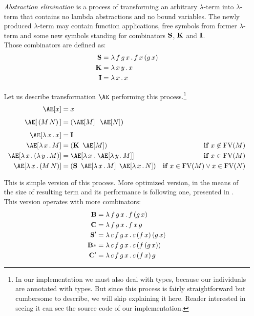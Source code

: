 \documentclass[12pt,a4paper]{report}
\newcommand{\Lets}{Let us\xspace}
\newcommand{\lterm}{$\lambda$-term\xspace}
\begin{document}
\textit{Abstraction elimination} is a process of transforming 
an arbitrary \lterm into \lterm that contains no lambda abstractions
and no bound variables.
The newly produced \lterm may contain function applications, 
free symbols from former \lterm and some new symbols standing for 
combinators $\mathbf{S}$, $\mathbf{K}$ and $\mathbf{I}$. \\

Those combinators are defined as:
\begin{align*}
\mathbf{S} &= \lambda \, f\,g\,x \, . \, f\,x\,(g\,x) \\
\mathbf{K} &= \lambda \, x\,y \, . \, x \\
\mathbf{I} &= \lambda \, x \, . \, x 
\end{align*}

\newcommand{\Ae}{\mathop{\mathrm{\AE}}}

\Lets describe transformation $\Ae$ performing this 
process.\footnote{In our implementation we must also deal with types, because 
our individuals are annotated with types. But since this process
is fairly straightforward but cumbersome to describe, we will 
skip explaining it here. Reader interested in seeing it can see 
the source code of our implementation. }
\begin{align*}
\Ae[x]           &= x &\\[0.4em]
\Ae[\,(M\,N)\,]  &= (\Ae[M]\;\;\Ae[N]) &\\[0.4em]
\Ae[\lam{x}{x}]  &= \Icomb &\\
\Ae[\lam{x}{M}]  &= (\Kcomb~\Ae[M]) &\textbf{if } x \not\in \FV(M)\\
\Ae[\lam{x}{\lamb{y}{M}}] &= \Ae[\lam{x}{\Ae[\lam{y}{M}]}]  
&\textbf{if } x \in \FV(M)\\
\Ae[\lam{x}{(M\,N)}] &= (\Scomb~\Ae[\lam{x}{M}]~\Ae[\lam{x}{N}])  
&\textbf{if } x \in \FV(M) \vee x \in \FV(N)\\
\end{align*}

\newcommand{\Bcomb }{\mathbf{B}}   
\newcommand{\BBcomb }{\mathbf{B*}}
\newcommand{\Ccomb }{\mathbf{C}}   
\newcommand{\CCcomb }{\mathbf{C'}}
\newcommand{\SScomb }{\mathbf{S'}}

This is simple version of this process. More optimized version,
in the means of the size of resulting term and its performance
is following one, presented in \cite{jones87}.\\

This version operates with more combinators:\\

\begin{align*}
\Bcomb  &= \lam{f\,g\,x}{f\,(g\,x)} \\
\Ccomb  &= \lam{f\,g\,x}{f\,x\,g} \\
\SScomb &= \lam{c\,f\,g\,x}{c\,(f\,x)\,(g\,x)} \\
\BBcomb &= \lam{c\,f\,g\,x}{c\,(f\,(g\,x))} \\
\CCcomb &= \lam{c\,f\,g\,x}{c\,(f\,x)\,g} \\
\end{align*}
\end{document}
